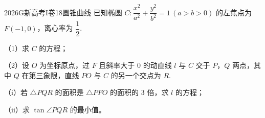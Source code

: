 
\begin{problem}{2026}{G}{新高考I卷}{18}{圆锥曲线}
已知椭圆 $ C:\dfrac{x^2}{a^2}+\dfrac{y^2}{b^2}=1\,(a>b>0) $ 的左焦点为 $ F(-1,0) $，离心率为 $ \dfrac{1}{2} $.

（1）求 $ C $ 的方程；

（2）设 $ O $ 为坐标原点，过 $ F $ 且斜率大于 $ 0 $ 的动直线 $ l $ 与 $ C $ 交于 $ P $，$ Q $ 两点，其中 $ Q $ 在第三象限，直线 $ PO $ 与 $ C $ 的另一个交点为 $ R $.

（i）若 $ \triangle PQR $ 的面积是 $ \triangle PFO $ 的面积的 $ 3 $ 倍，求 $ l $ 的方程；

（ii）求 $ \tan\angle PQR $ 的最小值。
\end{problem}

\begin{answer}

\end{answer}

\begin{solutions}

\end{solutions}